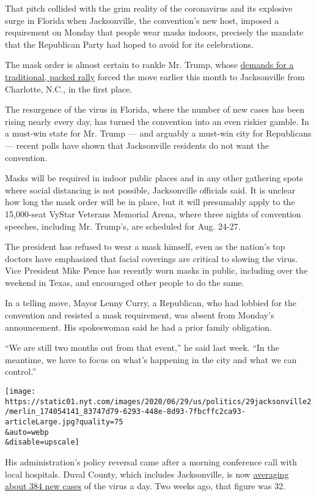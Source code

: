 That pitch collided with the grim reality of the coronavirus and its
explosive surge in Florida when Jacksonville, the convention's new host,
imposed a requirement on Monday that people wear masks indoors,
precisely the mandate that the Republican Party had hoped to avoid for
its celebrations.

The mask order is almost certain to rankle Mr. Trump, whose
\href{https://www.nytimes.com/2020/06/06/us/politics/republican-convention-charlotte-2020.html}{demands
for a traditional, packed rally} forced the move earlier this month to
Jacksonville from Charlotte, N.C., in the first place.

The resurgence of the virus in Florida, where the number of new cases
has been rising nearly every day, has turned the convention into an even
riskier gamble. In a must-win state for Mr. Trump --- and arguably a
must-win city for Republicans --- recent polls have shown that
Jacksonville residents do not want the convention.

Masks will be required in indoor public places and in any other
gathering spots where social distancing is not possible, Jacksonville
officials said. It is unclear how long the mask order will be in place,
but it will presumably apply to the 15,000-seat VyStar Veterans Memorial
Arena, where three nights of convention speeches, including Mr. Trump's,
are scheduled for Aug. 24-27.

The president has refused to wear a mask himself, even as the nation's
top doctors have emphasized that facial coverings are critical to
slowing the virus. Vice President Mike Pence has recently worn masks in
public, including over the weekend in Texas, and encouraged other people
to do the same.

In a telling move, Mayor Lenny Curry, a Republican, who had lobbied for
the convention and resisted a mask requirement, was absent from Monday's
announcement. His spokeswoman said he had a prior family obligation.

``We are still two months out from that event,'' he said last week. ``In
the meantime, we have to focus on what's happening in the city and what
we can control.''

\texttt{[image: https://static01.nyt.com/images/2020/06/29/us/politics/29jacksonville2/merlin\_174054141\_83747d79-6293-448e-8d93-7fbcffc2ca93-articleLarge.jpg?quality=75\\\&auto=webp\\\&disable=upscale]}

His administration's policy reversal came after a morning conference
call with local hospitals. Duval County, which includes Jacksonville, is
now
\href{https://www.nytimes.com/interactive/2020/us/florida-coronavirus-cases.html}{averaging
about 384 new cases} of the virus a day. Two weeks ago, that figure was
32.

